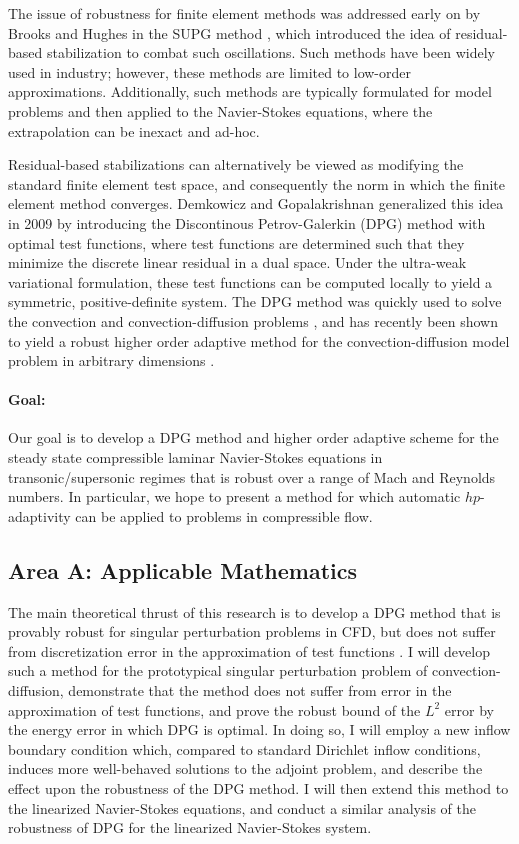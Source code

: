\documentclass[12pt,letterpaper,oneside]{article}
\begin{document}
The issue of robustness for finite element methods was addressed early on by Brooks and Hughes in the SUPG method \cite{SUPG}, which introduced the idea of residual-based stabilization to combat such oscillations. Such methods have been widely used in industry; however, these methods are limited to low-order approximations. Additionally, such methods are typically formulated for model problems and then applied to the Navier-Stokes equations, where the extrapolation can be inexact and ad-hoc.  

Residual-based stabilizations can alternatively be viewed as modifying the standard finite element test space, and consequently the norm in which the finite element method converges. Demkowicz and Gopalakrishnan generalized this idea in 2009 by introducing the Discontinous Petrov-Galerkin (DPG) method with optimal test functions, where test functions are determined such that they minimize the discrete linear residual in a dual space.  Under the ultra-weak variational formulation, these test functions can be computed locally to yield a symmetric, positive-definite system.  The DPG method was quickly used to solve the convection and convection-diffusion problems \cite{DPG1,DPG2,DPG3}, and has recently been shown to yield a robust higher order adaptive method for the convection-diffusion model problem in arbitrary dimensions \cite{DPGrobustness,DPGrobustness2}.  

\paragraph{Goal:} Our goal is to develop a DPG method and higher order adaptive scheme for the steady state compressible laminar Navier-Stokes equations in transonic/supersonic regimes that is robust over a range of Mach and Reynolds numbers. In particular, we hope to present a method for which automatic $hp$-adaptivity can be applied to problems in compressible flow.  

\subsection*{Area A: Applicable Mathematics}

The main theoretical thrust of this research is to develop a DPG method that is provably robust for singular perturbation problems in CFD, but does not suffer from discretization error in the approximation of test functions \cite{DPGrobustness, DPGrobustness2}.  I will develop such a method for the prototypical singular perturbation problem of convection-diffusion, demonstrate that the method does not suffer from error in the approximation of test functions, and prove the robust bound of the $L^2$ error by the energy error in which DPG is optimal.  In doing so, I will employ a new inflow boundary condition which, compared to standard Dirichlet inflow conditions, induces more well-behaved solutions to the adjoint problem, and describe the effect upon the robustness of the DPG method.  I will then extend this method to the linearized Navier-Stokes equations, and conduct a similar analysis of the robustness of DPG for the linearized Navier-Stokes system.  
\end{document}
